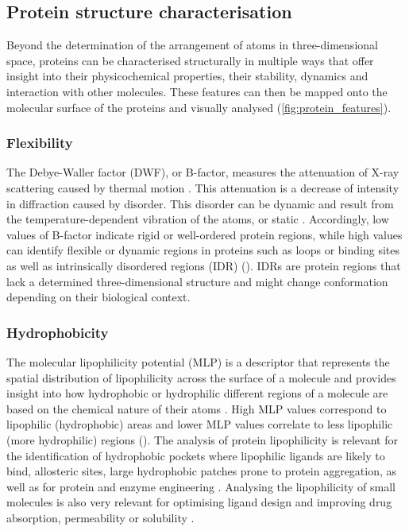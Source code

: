 \subsection{Protein structure characterisation}

Beyond the determination of the arrangement of atoms in three-dimensional space, proteins can be characterised structurally in multiple ways that offer insight into their physicochemical properties, their stability, dynamics and interaction with other molecules. These features can then be mapped onto the molecular surface of the proteins and visually analysed (\autoref{fig:protein_features}).

\subsubsection{Flexibility}

The Debye-Waller factor (DWF), or B-factor, measures the attenuation of X-ray scattering caused by thermal motion \cite{DEBYE_1913_BFACTOR, WALLER_1923_BFACTOR}. This attenuation is a decrease of intensity in diffraction caused by disorder. This disorder can be dynamic and result from the temperature-dependent vibration of the atoms, or static \cite{SUN_2019_BFACTOR}. Accordingly, low values of B-factor indicate rigid or well-ordered protein regions, while high values can identify flexible or dynamic regions in proteins such as loops or binding sites as well as intrinsically disordered regions (IDR) (). IDRs are protein regions that lack a determined three-dimensional structure and might change conformation depending on their biological context.

\subsubsection{Hydrophobicity}

The molecular lipophilicity potential (MLP) is a descriptor that represents the spatial distribution of lipophilicity across the surface of a molecule and provides insight into how hydrophobic or hydrophilic different regions of a molecule are based on the chemical nature of their atoms \cite{BROTO_1984_MLP, LAGUERRE_1997_MLP}. High MLP values correspond to lipophilic (hydrophobic) areas and lower MLP values correlate to less lipophilic (more hydrophilic) regions (). The analysis of protein lipophilicity is relevant for the identification of hydrophobic pockets where lipophilic ligands are likely to bind, allosteric sites, large hydrophobic patches prone to protein aggregation, as well as for protein and enzyme engineering \cite{EFREMOV_2007_MLP}. Analysing the lipophilicity of small molecules is also very relevant for optimising ligand design and improving drug absorption, permeability or solubility \cite{GAILLARD_1994_MLP}.

